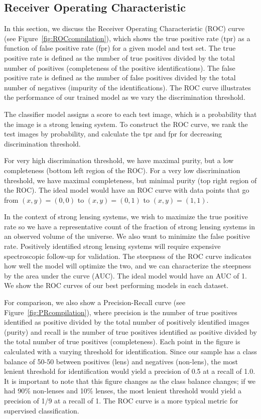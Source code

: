 \documentclass{emulateapj}
\begin{document}
\subsection{Receiver Operating Characteristic}\label{sec:ROC}

In this section, we discuss the Receiver Operating Characteristic
(ROC) curve (see Figure~\ref{fig:ROCcompilation}), which shows the
true positive rate (tpr) as a function of false positive rate (fpr)
for a given model and test set.  The true positive rate is defined as
the number of true positives divided by the total number of positives
(completeness of the positive identifications).  The false positive
rate is defined as the number of false positives divided by the total
number of negatives (impurity of the identifications).  The ROC curve
illustrates the performance of our trained model as we vary the
discrimination threshold.

The classifier model assigns a score to each test image, which is a
probability that the image is a strong lensing system.  To construct
the ROC curve, we rank the test images by probability, and calculate
the tpr and fpr for decreasing discrimination threshold.

For very high discrimination threshold, we have maximal purity, but a
low completeness (bottom left region of the ROC).  For a very low
discrimination threshold, we have maximal completeness, but minimal
purity (top right region of the ROC).  The ideal model would have an
ROC curve with data points that go from $(x, y) = (0, 0)$ to $(x, y) =
(0, 1)$ to $(x, y) = (1, 1)$.

In the context of strong lensing systems, we wish to maximize the true
positive rate so we have a representative count of the fraction of
strong lensing systems in an observed volume of the universe.  We also
want to minimize the false positive rate.  Positively identified
strong lensing systems will require expensive spectroscopic follow-up
for validation.  The steepness of the ROC curve indicates how well the
model will optimize the two, and we can characterize the steepness by
the area under the curve (AUC).  The ideal model would have an AUC of
1.  We show the ROC curves of our best performing models in each
dataset.

For comparison, we also show a Precision-Recall curve (see
Figure~\ref{fig:PRcompilation}), where precision is the number of true
positives identified as positive divided by the total number of
positively identified images (purity) and recall is the number of true
positives identified as positive divided by the total number of true
positives (completeness).  Each point in the figure is calculated with
a varying threshold for identification.  Since our sample has a class
balance of 50-50 between positives (lens) and negatives (non-lens),
the most lenient threshold for identification would yield a precision
of 0.5 at a recall of 1.0.  It is important to note that this figure
changes as the class balance changes; if we had 90\% non-lenses and
10\% lenses, the most lenient threshold would yield a precision of 1/9
at a recall of 1.  The ROC curve is a more typical metric for
supervised classification.
\end{document}
